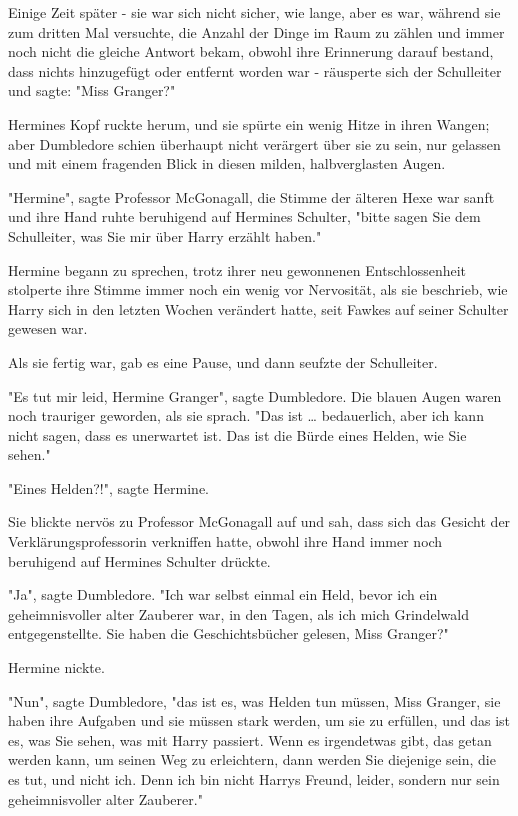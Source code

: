 {Einige Zeit später - sie war sich nicht sicher, wie lange, aber es war, während sie zum dritten Mal versuchte, die Anzahl der Dinge im Raum zu zählen und immer noch nicht die gleiche Antwort bekam, obwohl ihre Erinnerung darauf bestand, dass nichts hinzugefügt oder entfernt worden war - räusperte sich der Schulleiter und sagte: "Miss Granger?"

Hermines Kopf ruckte herum, und sie spürte ein wenig Hitze in ihren Wangen; aber Dumbledore schien überhaupt nicht verärgert über sie zu sein, nur gelassen und mit einem fragenden Blick in diesen milden, halbverglasten Augen.

"Hermine", sagte Professor McGonagall, die Stimme der älteren Hexe war sanft und ihre Hand ruhte beruhigend auf Hermines Schulter, "bitte sagen Sie dem Schulleiter, was Sie mir über Harry erzählt haben."

Hermine begann zu sprechen, trotz ihrer neu gewonnenen Entschlossenheit stolperte ihre Stimme immer noch ein wenig vor Nervosität, als sie beschrieb, wie Harry sich in den letzten Wochen verändert hatte, seit Fawkes auf seiner Schulter gewesen war.

Als sie fertig war, gab es eine Pause, und dann seufzte der Schulleiter.

"Es tut mir leid, Hermine Granger", sagte Dumbledore. Die blauen Augen waren noch trauriger geworden, als sie sprach. "Das ist … bedauerlich, aber ich kann nicht sagen, dass es unerwartet ist. Das ist die Bürde eines Helden, wie Sie sehen."

"Eines Helden?!", sagte Hermine.

Sie blickte nervös zu Professor McGonagall auf und sah, dass sich das Gesicht der Verklärungsprofessorin verkniffen hatte, obwohl ihre Hand immer noch beruhigend auf Hermines Schulter drückte.

"Ja", sagte Dumbledore. "Ich war selbst einmal ein Held, bevor ich ein geheimnisvoller alter Zauberer war, in den Tagen, als ich mich Grindelwald entgegenstellte. Sie haben die Geschichtsbücher gelesen, Miss Granger?"

Hermine nickte.

"Nun", sagte Dumbledore, "das ist es, was Helden tun müssen, Miss Granger, sie haben ihre Aufgaben und sie müssen stark werden, um sie zu erfüllen, und das ist es, was Sie sehen, was mit Harry passiert. Wenn es irgendetwas gibt, das getan werden kann, um seinen Weg zu erleichtern, dann werden Sie diejenige sein, die es tut, und nicht ich. Denn ich bin nicht Harrys Freund, leider, sondern nur sein geheimnisvoller alter Zauberer."

}
